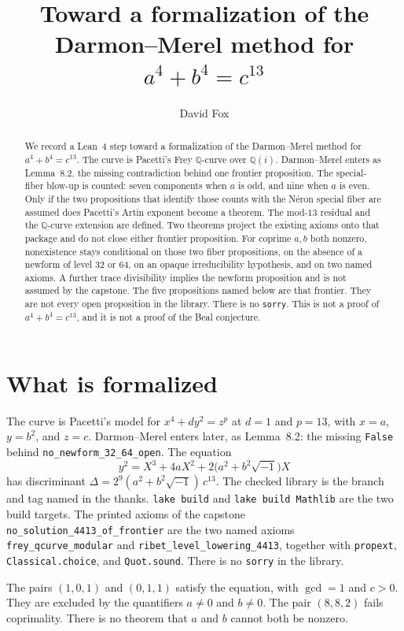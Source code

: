 \documentclass[11pt]{amsart}
\title[Toward Darmon--Merel for $a^4+b^4=c^{13}$]{Toward a formalization of the Darmon--Merel method for $a^4+b^4=c^{13}$}
\author{David Fox}
\date{}
\begin{document}
\begin{abstract}
We record a Lean~4 step toward a formalization of the Darmon--Merel method for $a^4+b^4=c^{13}$.
The curve is Pacetti's Frey $\mathbb Q$-curve over $\mathbb Q(i)$.
Darmon--Merel enters as Lemma~8.2, the missing contradiction behind one frontier proposition.
The special-fiber blow-up is counted: seven components when $a$ is odd, and nine when $a$ is even.
Only if the two propositions that identify those counts with the N\'eron special fiber are assumed does Pacetti's Artin exponent become a theorem.
The mod-$13$ residual and the $\mathbb Q$-curve extension are defined.
Two theorems project the existing axioms onto that package and do not close either frontier proposition.
For coprime $a,b$ both nonzero, nonexistence stays conditional on those two fiber propositions, on the absence of a newform of level $32$ or $64$, on an opaque irreducibility hypothesis, and on two named axioms.
A further trace divisibility implies the newform proposition and is not assumed by the capstone.
The five propositions named below are that frontier.
They are not every open proposition in the library.
There is no \texttt{sorry}.
This is not a proof of $a^4+b^4=c^{13}$, and it is not a proof of the Beal conjecture.
\end{abstract}
\maketitle

\section{What is formalized}
The curve is Pacetti's model for $x^4+dy^2=z^p$ at $d=1$ and $p=13$, with $x=a$, $y=b^2$, and $z=c$.
Darmon--Merel enters later, as Lemma~8.2: the missing \texttt{False} behind \texttt{no\_newform\_32\_64\_open}.
The equation
\[
y^2 = X^3 + 4a X^2 + 2\bigl(a^2 + b^2\sqrt{-1}\bigr) X
\]
has discriminant $\Delta = 2^9(a^2+b^2\sqrt{-1})\,c^{13}$.
The checked library is the branch and tag named in the thanks.
\texttt{lake build} and \texttt{lake build Mathlib} are the two build targets.
The printed axioms of the capstone \texttt{no\_solution\_4413\_of\_frontier} are the two named axioms \texttt{frey\_qcurve\_modular} and \texttt{ribet\_level\_lowering\_4413}, together with \texttt{propext}, \texttt{Classical.choice}, and \texttt{Quot.sound}.
There is no \texttt{sorry} in the library.

The pairs $(1,0,1)$ and $(0,1,1)$ satisfy the equation, with $\gcd=1$ and $c>0$.
They are excluded by the quantifiers $a\neq 0$ and $b\neq 0$.
The pair $(8,8,2)$ fails coprimality.
There is no theorem that $a$ and $b$ cannot both be nonzero.
\end{document}
